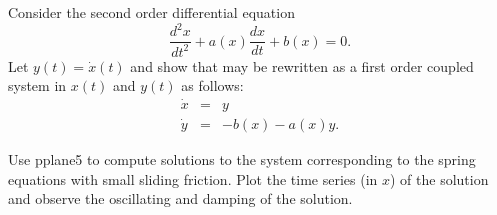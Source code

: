\begin{exercise} \label{c3.5.5}
Consider the second order differential equation
\begin{equation}  \label{E:2ndorder}
\frac{d^2x}{dt^2} + a(x)\frac{dx}{dt} + b(x) = 0.
\end{equation}
Let $y(t)=\dot{x}(t)$ and show that  may be
rewritten as a first order coupled system in $x(t)$ and $y(t)$
as follows:
\begin{eqnarray*}
\dot{x} & = & y \\
\dot{y} & = & -b(x) - a(x) y.
\end{eqnarray*}
\end{exercise}


\CEXER

\begin{exercise} \label{c6.7.5}
Use {\sf pplane5} to compute solutions to the system corresponding to the
spring equations with small sliding friction.  Plot the time series (in $x$)
of the solution and observe the oscillating and damping of the solution.
\end{exercise}








